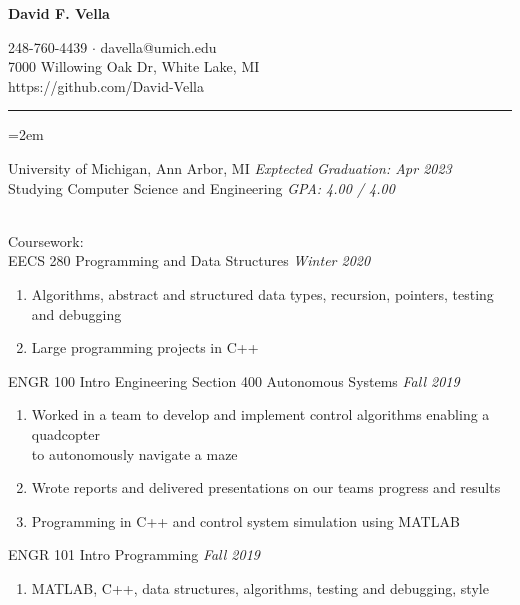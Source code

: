 \documentclass[12pt]{article}
\newcommand{\rheader}[1] { 
    \noindent{ \large \textbf{#1} \par }
    \vspace{-10pt}
    \noindent \rule{7.5in}{0.5pt} 
}
\newcommand{\rdate}[1]{
    \hfill \textit{#1}
}
\newcommand{\ritem} {
    \vspace{-10pt} \item
}
\newenvironment{rsection} {
    \vspace{-5pt}
    \par \medskip
    \leftskip=2em
    \noindent \ignorespaces
} {
    \par \medskip
    \vspace{5pt}
}
\newenvironment{rlist} {
    \begin{enumerate}[leftmargin=0.75in, label=$\bullet$]
} {
    \end{enumerate}
    \vspace{-10pt}
}
\begin{document}
\begin{center}
    {\Large \textbf{David F. Vella} \par}
    \vspace{5pt}
    248-760-4439 $\cdot$ davella@umich.edu \\
    7000 Willowing Oak Dr, White Lake, MI \\
    https://github.com/David-Vella
\end{center}

\vspace{-10pt}

\rheader{EDUCATION}
\begin{rsection}
    University of Michigan, Ann Arbor, MI \rdate{Exptected Graduation: Apr 2023} \\
    Studying Computer Science and Engineering \rdate{GPA: 4.00 / 4.00}
    \vspace{5pt} \\
    \noindent Coursework: \\
    EECS 280 Programming and Data Structures \rdate{Winter 2020}
    \begin{rlist}
        \ritem Algorithms, abstract and structured data types, recursion, pointers, testing and debugging
        \ritem Large programming projects in C++
    \end{rlist}
    ENGR 100 Intro Engineering Section 400 Autonomous Systems \rdate{Fall 2019}
    \begin{rlist}
        \ritem Worked in a team to develop and implement control algorithms enabling a quadcopter \\ to autonomously navigate a maze
        \ritem Wrote reports and delivered presentations on our teams progress and results
        \ritem Programming in C++ and control system simulation using MATLAB 
    \end{rlist}
    ENGR 101 Intro Programming \rdate{Fall 2019}
    \begin{rlist}
        \ritem MATLAB, C++, data structures, algorithms, testing and debugging, style 
    \end{rlist}
\end{rsection}
\end{document}
